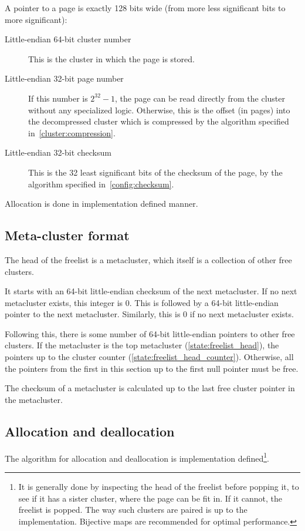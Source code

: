 \documentclass[11pt,a4paper]{report}
\begin{document}
        A pointer to a page is exactly 128 bits wide (from more less
        significant bits to more significant):

        \begin{description}
            \item [Little-endian 64-bit cluster number] This is the cluster in
                which the page is stored.
            \item [Little-endian 32-bit page number] If this number is $2^{32}
                - 1$, the page can be read directly from the cluster without
                any specialized logic.  Otherwise, this is the offset (in
                pages) into the decompressed cluster which is compressed by the
                algorithm specified in~\ref{cluster:compression}.
            \item [Little-endian 32-bit checksum] This is the 32 least
                significant bits of the checksum of the page, by the algorithm
                specified in~\ref{config:checksum}.
        \end{description}

        Allocation is done in implementation defined manner.

        \subsection{Meta-cluster format}
        \label{cluster:metacluster}
        The head of the freelist is a metacluster, which itself is a collection
        of other free clusters.

        It starts with an 64-bit little-endian checksum of the next
        metacluster. If no next metacluster exists, this integer is 0. This is
        followed by a 64-bit little-endian pointer to the next metacluster.
        Similarly, this is 0 if no next metacluster exists.

        Following this, there is some number of 64-bit little-endian pointers
        to other free clusters. If the metacluster is the top metacluster
        (\ref{state:freelist_head}), the pointers up to the cluster counter
        (\ref{state:freelist_head_counter}). Otherwise, all the pointers from
        the first in this section up to the first null pointer must be free.

        The checksum of a metacluster is calculated up to the last free cluster
        pointer in the metacluster.

        \subsection{Allocation and deallocation}
        The algorithm for allocation and deallocation is implementation
        defined\footnote{It is generally done by inspecting the head of the
        freelist before popping it, to see if it has a sister cluster,
        where the page can be fit in. If it cannot, the freelist is popped.
        The way such clusters are paired is up to the implementation.
        Bijective maps are recommended for optimal performance.}.
\end{document}
